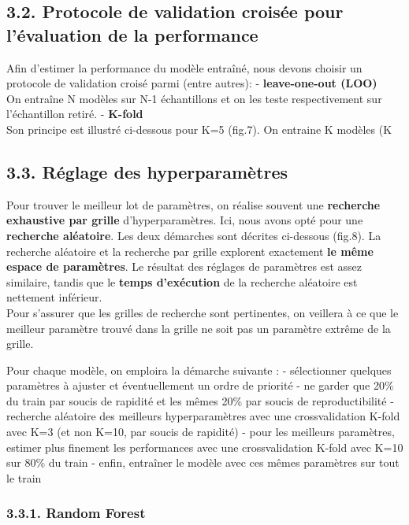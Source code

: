 \documentclass[11pt]{article}
\begin{document}
    \subsection{3.2. Protocole de validation croisée pour l'évaluation de la
performance}\label{protocole-de-validation-croisuxe9e-pour-luxe9valuation-de-la-performance}

    Afin d'estimer la performance du modèle entraîné, nous devons choisir un
protocole de validation croisé parmi (entre autres): -
\textbf{leave-one-out (LOO)}\\
On entraîne N modèles sur N-1 échantillons et on les teste
respectivement sur l'échantillon retiré. - \textbf{K-fold}\\
Son principe est illustré ci-dessous pour K=5 (fig.7). On entraine K
modèles (K

    \subsection{3.3. Réglage des
hyperparamètres}\label{ruxe9glage-des-hyperparamuxe8tres}

    Pour trouver le meilleur lot de paramètres, on réalise souvent une
\textbf{recherche exhaustive par grille} d'hyperparamètres. Ici, nous
avons opté pour une \textbf{recherche aléatoire}. Les deux démarches
sont décrites ci-dessous (fig.8). La recherche aléatoire et la recherche
par grille explorent exactement \textbf{le même espace de paramètres}.
Le résultat des réglages de paramètres est assez similaire, tandis que
le \textbf{temps d'exécution} de la recherche aléatoire est nettement
inférieur.\\
Pour s'assurer que les grilles de recherche sont pertinentes, on
veillera à ce que le meilleur paramètre trouvé dans la grille ne soit
pas un paramètre extrême de la grille.

Pour chaque modèle, on emploira la démarche suivante : - sélectionner
quelques paramètres à ajuster et éventuellement un ordre de priorité -
ne garder que 20\% du train par soucis de rapidité et les mêmes 20\% par
soucis de reproductibilité - recherche aléatoire des meilleurs
hyperparamètres avec une crossvalidation K-fold avec K=3 (et non K=10,
par soucis de rapidité) - pour les meilleurs paramètres, estimer plus
finement les performances avec une crossvalidation K-fold avec K=10 sur
80\% du train - enfin, entraîner le modèle avec ces mêmes paramètres sur
tout le train

    \subsubsection{3.3.1. Random Forest}\label{random-forest}
\end{document}
